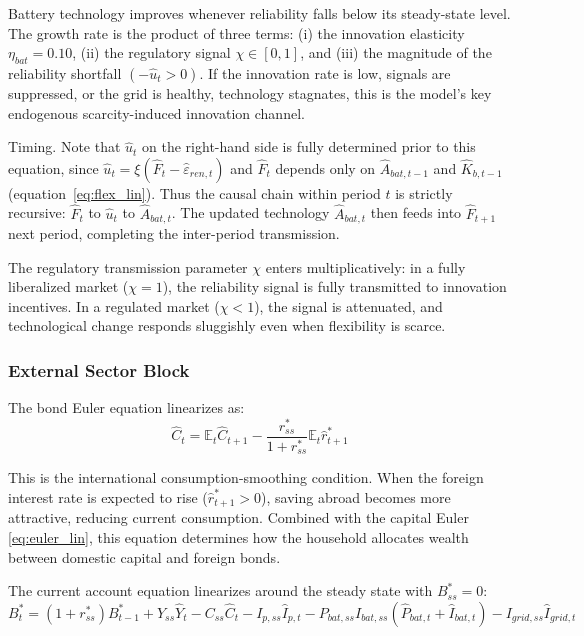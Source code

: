 \documentclass[12pt, a4paper]{article}
\begin{document}
	Battery technology improves whenever reliability falls below its steady-state level. The growth rate is the product of three terms: (i) the innovation elasticity $\eta_{bat} = 0.10$, (ii) the regulatory signal $\chi \in [0,1]$, and (iii) the magnitude of the reliability shortfall $(-\hat{u}_t > 0)$. If the innovation rate is low, signals are suppressed, or the grid is healthy, technology stagnates, this is the model's key endogenous scarcity-induced innovation channel.
	
	\noindent Timing. Note that $\hat{u}_t$ on the right-hand side is fully determined prior to this equation, since $\hat{u}_t = \xi(\hat{F}_t - \hat{\varepsilon}_{ren,t})$ and $\hat{F}_t$ depends only on $\hat{A}_{bat,t-1}$ and $\hat{K}_{b,t-1}$ (equation~\ref{eq:flex_lin}). Thus the causal chain within period $t$ is strictly recursive: $\hat{F}_t$ to $\hat{u}_t$ to $\hat{A}_{bat,t}$. The updated technology $\hat{A}_{bat,t}$ then feeds into $\hat{F}_{t+1}$ next period, completing the inter-period transmission.
	
	The regulatory transmission parameter $\chi$ enters multiplicatively: in a fully liberalized market ($\chi = 1$), the reliability signal is fully transmitted to innovation incentives. In a regulated market ($\chi < 1$), the signal is attenuated, and technological change responds sluggishly even when flexibility is scarce.
	
	\subsubsection{External Sector Block}
	
	The bond Euler equation linearizes as:
	\begin{equation}
		\hat{C}_t = \mathbb{E}_t \hat{C}_{t+1} - \frac{r^*_{ss}}{1+r^*_{ss}} \mathbb{E}_t \hat{r}^*_{t+1}
		\label{eq:bond_euler_lin}
	\end{equation}
	
	This is the international consumption-smoothing condition. When the foreign interest rate is expected to rise ($\hat{r}^*_{t+1} > 0$), saving abroad becomes more attractive, reducing current consumption. Combined with the capital Euler \eqref{eq:euler_lin}, this equation determines how the household allocates wealth between domestic capital and foreign bonds.
	
	The current account equation linearizes around the steady state with $B^*_{ss} = 0$:
	\begin{equation}
		B^*_t = (1 + r^*_{ss}) B^*_{t-1} + Y_{ss}\hat{Y}_t - C_{ss}\hat{C}_t - I_{p,ss}\hat{I}_{p,t} - P_{bat,ss}I_{bat,ss}(\hat{P}_{bat,t} + \hat{I}_{bat,t}) - I_{grid,ss}\hat{I}_{grid,t}
		\label{eq:ca_lin}
	\end{equation}
	
\end{document}
